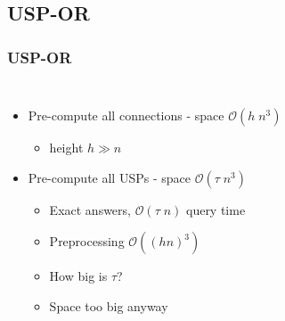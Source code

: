 \documentclass[]{beamer}
\begin{document}
        \subsection{USP-OR}
        \begin{frame}
            \frametitle{USP-OR}
            \begin{columns}[c]
            \column{2.9in}
				\begin{itemize}
					\item<1-> Pre-compute all connections - space $\mathcal{O}(h \; n^{3})$
					\begin{itemize}
	                	\item height $h \gg n$ 
	                \end{itemize}
	                \item<2-> Pre-compute all USPs - space $\mathcal{O}(\tau \; n^{3})$
	                \begin{itemize}
	                	\item Exact answers, $\mathcal{O}(\tau \; n)$ query time
	                	\item Preprocessing $\mathcal{O}((hn)^{3})$
	                	\item How big is $\tau$?
	                	\item<4-> Space too big anyway
	                \end{itemize}
	            \end{itemize}
	        \column{2.1in}
	        \end{columns}
        \end{frame}  	
        
\end{document}
